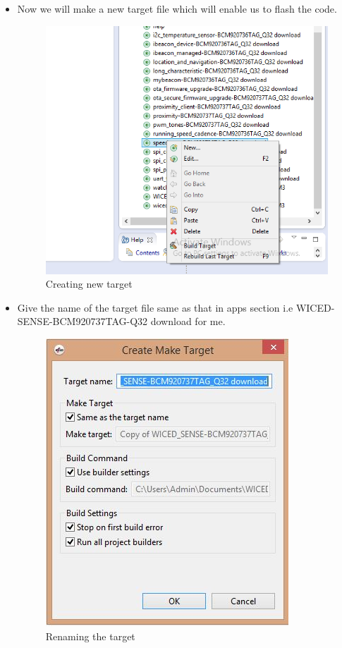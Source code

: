 \documentclass[11pt,a4paper]{article}
\begin{document}
\begin{itemize}
	

	\newpage
	
	\item Now we will make a new target file which will enable us to flash the code.
	\begin{figure}[h]
    \centering
	\includegraphics[scale=0.6]{newtarget.png}
	\caption{Creating new target}
	\end{figure}
	
		\item Give the name of the target file same as that in apps section i.e {WICED-SENSE-BCM920737TAG-Q32} download for me.
		\begin{figure}[h]
    \centering
	\includegraphics[scale=0.6]{createmaketarget.JPG}
	\caption{Renaming the target}
	\end{figure}
	


\end{itemize}
\end{document}
